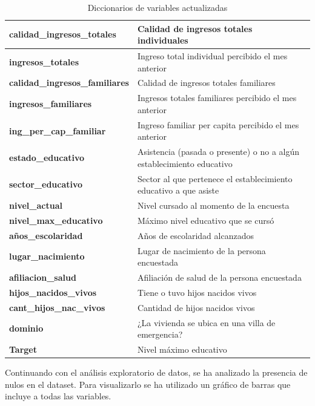 \documentclass[a4paper]{article}
\begin{document}
\begin{table}[H]
\begin{tabular}{|l|l|}
        \textbf{calidad\_ingresos\_totales}    & Calidad de ingresos totales individuales \\ \hline
        \textbf{ingresos\_totales}             & Ingreso total individual percibido el mes anterior \\ \hline
        \textbf{calidad\_ingresos\_familiares} & Calidad de ingresos totales familiares \\ \hline
        \textbf{ingresos\_familiares}          & Ingresos totales familiares percibido el mes anterior \\ \hline
        \textbf{ing\_per\_cap\_familiar}       & Ingreso familiar per capita percibido el mes anterior \\ \hline
        \textbf{estado\_educativo}             & Asistencia (pasada o presente) o no a algún establecimiento educativo \\ \hline
        \textbf{sector\_educativo}             & Sector al que pertenece el establecimiento educativo a que asiste \\ \hline
        \textbf{nivel\_actual}                 & Nivel cursado al momento de la encuesta \\ \hline
        \textbf{nivel\_max\_educativo}         & Máximo nivel educativo que se cursó \\ \hline
        \textbf{años\_escolaridad}             & Años de escolaridad alcanzados \\ \hline
        \textbf{lugar\_nacimiento}             & Lugar de nacimiento de la persona encuestada \\ \hline
        \textbf{afiliacion\_salud}             & Afiliación de salud de la persona encuestada \\ \hline
        \textbf{hijos\_nacidos\_vivos}         & Tiene o tuvo hijos nacidos vivos \\ \hline
        \textbf{cant\_hijos\_nac\_vivos}       & Cantidad de hijos nacidos vivos \\ \hline
        \textbf{dominio}                       & ¿La vivienda se ubica en una villa de emergencia? \\ \hline
        \textbf{Target}                        & Nivel máximo educativo \\ \hline
    \end{tabular}
    \caption{Diccionarios de variables actualizadas}
    \label{dictionary}
    \end{table}
 
    \newpage

    Continuando con el análisis exploratorio de datos, se ha analizado la presencia de nulos en el dataset. Para visualizarlo se ha utilizado un gráfico de barras que incluye a todas las variables. 
   
\end{document}
